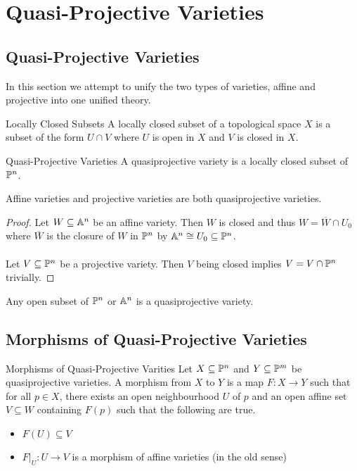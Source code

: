 \documentclass[a4paper]{article}
\begin{document}
\pagebreak
\section{Quasi-Projective Varieties}
\subsection{Quasi-Projective Varieties}
In this section we attempt to unify the two types of varieties, affine and projective into one unified theory. 

\begin{defn}{Locally Closed Subsets}{} A locally closed subset of a topological space $X$ is a subset of the form $U\cap V$ where $U$ is open in $X$ and $V$ is closed in $X$. 
\end{defn}

\begin{defn}{Quasi-Projective Varieties}{} A quasiprojective variety is a locally closed subset of $\mathbb{P}^n$. 
\end{defn}

\begin{lmm}{}{} Affine varieties and projective varieties are both quasiprojective varieties. \tcbline
\begin{proof}
Let $W\subseteq\mathbb{A}^n$ be an affine variety. Then $W$ is closed and thus $W=\overline{W}\cap U_0$ where $\overline{W}$ is the closure of $W$ in $\mathbb{P}^n$ by $\mathbb{A}^n\cong U_0\subseteq\mathbb{P}^n$. \\~\\
Let $V\subseteq\mathbb{P}^n$ be a projective variety. Then $V$ being closed implies $V=V\cap\mathbb{P}^n$ trivially. 
\end{proof}
\end{lmm}

\begin{lmm}{}{} Any open subset of $\mathbb{P}^n$ or $\mathbb{A}^n$ is a quasiprojective variety. 
\end{lmm}

\subsection{Morphisms of Quasi-Projective Varieties}
\begin{defn}{Morphisms of Quasi-Projective Varities}{} Let $X\subseteq\mathbb{P}^n$ and $Y\subseteq\mathbb{P}^m$ be quasiprojective varieties. A morphism from $X$ to $Y$ is a map $F:X\to Y$ such that for all $p\in X$, there exists an open neighbourhood $U$ of $p$ and an open affine set $V\subseteq W$ containing $F(p)$ such that the following are true. 
\begin{itemize}
\item $F(U)\subseteq V$
\item $F|_U:U\to V$ is a morphism of affine varieties (in the old sense)
\end{itemize}
\end{defn}
\end{document}
